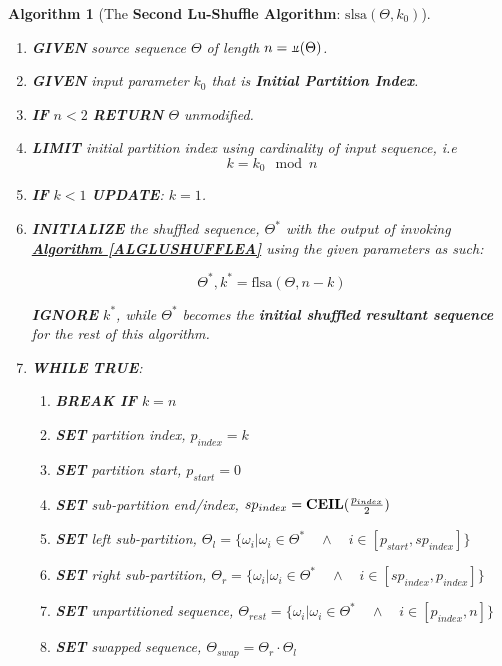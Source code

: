 \documentclass[a4paper, 18pt]{book} %
\newtheorem{alg}{Algorithm}
\newcommand{\invpi}{\rotatebox[origin=c]{180}{$\pi$}}
\begin{document}
\begin{alg}[The \textbf{Second Lu-Shuffle Algorithm}: $\text{slsa}(\Theta, k_0)$]
\label{ALGLUSHUFFLEB}
$ $\\
\begin{enumerate}
\item \textbf{GIVEN} source sequence $\Theta$ of length $n = \invpi(\Theta)$.
\item  \textbf{GIVEN} input parameter $k_0$ that is \textbf{Initial Partition Index}.
\item \textbf{IF} $n < 2$ \textbf{RETURN} $\Theta$ unmodified.
\item {\textbf{LIMIT} initial partition index using cardinality of input sequence, i.e
\begin{equation}
k = k_0 \mod n
\end{equation}
}
\item \textbf{IF} $k < 1$ \textbf{UPDATE}: $k = 1$.
\item{  \textbf{INITIALIZE} the shuffled sequence, $\Theta^*$ with the output of invoking \textbf{\hyperref[ALGLUSHUFFLEA]{Algorithm \ref{ALGLUSHUFFLEA}}} using the given parameters as such:

		\begin{equation}
		\label{EQIPI}
		\Theta^*,k^* = \text{flsa}(\Theta, n - k)
		\end{equation}
		
		\textbf{IGNORE} $k^*$, while $\Theta^*$ becomes the \textbf{initial shuffled resultant sequence} for the rest of this algorithm.
}
\item { \textbf{WHILE} \textbf{TRUE}:
\begin{enumerate}
	\item \textbf{BREAK IF} $k = n$
	\item \textbf{SET} partition index, $p_{index} = k$
	\item \textbf{SET} partition start, $p_{start} = 0$
	\item \textbf{SET} sub-partition end/index, $sp_{index} = \text{\textbf{CEIL}}(\frac{p_{index}}{2})$
	\item \textbf{SET} left sub-partition, $\Theta_{l} = \{\omega_i | \omega_i \in \Theta^* \quad \land \quad i \in [p_{start},sp_{index}]\}$
	\item \textbf{SET} right sub-partition, $\Theta_{r} = \{\omega_i | \omega_i \in \Theta^* \quad \land \quad i \in [sp_{index},p_{index}]\}$
	\item \textbf{SET} unpartitioned sequence, $\Theta_{rest} = \{\omega_i | \omega_i \in \Theta^* \quad \land \quad i \in [p_{index},n]\}$
	\item \textbf{SET} swapped sequence, $\Theta_{swap} = \Theta_{r} \cdot \Theta_{l}$ 
	

\end{enumerate}}
\end{enumerate}
\end{alg}
\end{document}
